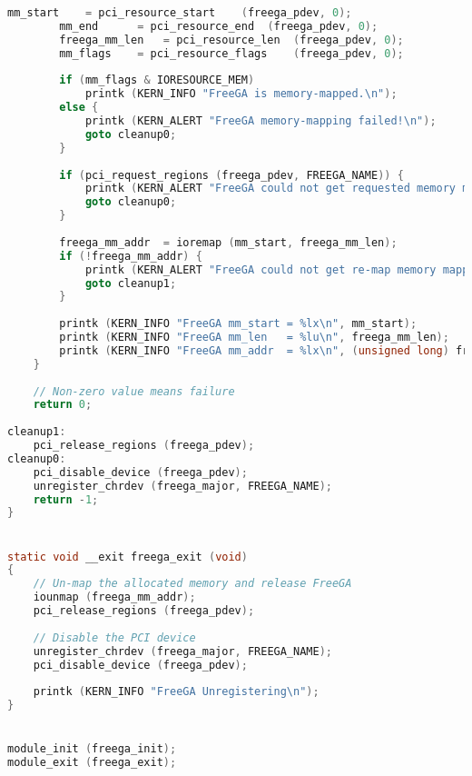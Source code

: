 \begin{lstlisting}[language=C]
		mm_start	= pci_resource_start	(freega_pdev, 0);
		mm_end		= pci_resource_end	(freega_pdev, 0);
		freega_mm_len	= pci_resource_len	(freega_pdev, 0);
		mm_flags	= pci_resource_flags	(freega_pdev, 0);
		
		if (mm_flags & IORESOURCE_MEM)
			printk (KERN_INFO "FreeGA is memory-mapped.\n");
		else {
			printk (KERN_ALERT "FreeGA memory-mapping failed!\n");
			goto cleanup0;
		}
		
		if (pci_request_regions (freega_pdev, FREEGA_NAME)) {
			printk (KERN_ALERT "FreeGA could not get requested memory mapped region!\n");
			goto cleanup0;
		}
		
		freega_mm_addr	= ioremap (mm_start, freega_mm_len);
		if (!freega_mm_addr) {
			printk (KERN_ALERT "FreeGA could not get re-map memory mapped region!\n");
			goto cleanup1;
		}
		
		printk (KERN_INFO "FreeGA mm_start = %lx\n", mm_start);
		printk (KERN_INFO "FreeGA mm_len   = %lu\n", freega_mm_len);
		printk (KERN_INFO "FreeGA mm_addr  = %lx\n", (unsigned long) freega_mm_addr);
	}
	
	// Non-zero value means failure
	return 0;
	
cleanup1:
	pci_release_regions (freega_pdev);
cleanup0:
	pci_disable_device (freega_pdev);
	unregister_chrdev (freega_major, FREEGA_NAME);
	return -1;
}


static void __exit freega_exit (void)
{
	// Un-map the allocated memory and release FreeGA
	iounmap (freega_mm_addr);
	pci_release_regions (freega_pdev);
	
	// Disable the PCI device
	unregister_chrdev (freega_major, FREEGA_NAME);
	pci_disable_device (freega_pdev);
	
	printk (KERN_INFO "FreeGA Unregistering\n");
}


module_init (freega_init);
module_exit (freega_exit);
\end{lstlisting}
\label{FreeGA_Module}


